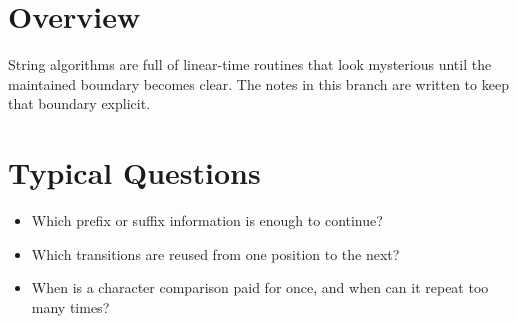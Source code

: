 \section*{Overview}

String algorithms are full of linear-time routines that look mysterious until the maintained boundary becomes clear.
The notes in this branch are written to keep that boundary explicit.

\section*{Typical Questions}

\begin{itemize}
  \item Which prefix or suffix information is enough to continue?
  \item Which transitions are reused from one position to the next?
  \item When is a character comparison paid for once, and when can it repeat too many times?
\end{itemize}
